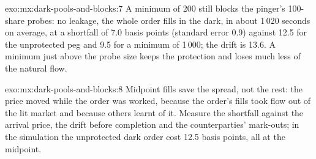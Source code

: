 \begin{solution}{exo:mx:dark-pools-and-blocks:7}
A minimum of 200 still blocks the pinger's 100-share probes: no leakage, the whole order fills in the dark, in about 1\,020 seconds on average, at a
shortfall of 7.0 basis points (standard error 0.9) against 12.5 for the unprotected peg and 9.5 for a minimum of 1\,000; the drift is 13.6. A minimum just
above the probe size keeps the protection and loses much less of the natural flow.
\end{solution}

\begin{solution}{exo:mx:dark-pools-and-blocks:8}
Midpoint fills save the spread, not the rest: the price moved while the order was worked, because the order's fills took flow out of the lit market and
because others learnt of it. Measure the shortfall against the arrival price, the drift before completion and the counterparties' mark-outs; in the
simulation the unprotected dark order cost 12.5 basis points, all at the midpoint.
\end{solution}

